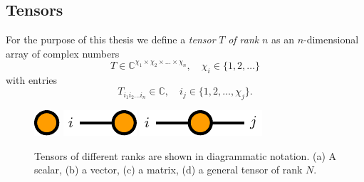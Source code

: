 \subsection*{Tensors}
For the purpose of this thesis we define a \textit{tensor} $T$ \textit{of rank} $n$ as an $n$-dimensional array of complex numbers
\begin{equation}
	T \in \mathbb{C}^{\chi_1\times\chi_2\times\dots\times\chi_n}, \quad \chi_i \in \{1, 2, \dots\}
\end{equation}
with entries
\begin{equation}
	T_{i_1i_2\dots i_n} \in \mathbb{C}, \quad i_j \in \{1, 2, \dots, \chi_j\}.
\end{equation}
\begin{figure}
	\centering
	\subcaptionbox{\label{fig:basic_tensor_diagrams_scalar}}
	{%
		\raisebox{\dimexpr.5\ht\largestimage-.5\height}
		{%
			\includegraphics[scale=1]{figures/tikz/Tensor_Networks/basic_diagrams/basic_diagrams_a.pdf}
		}
	}
	\subcaptionbox{\label{fig:basic_tensor_diagrams_vector}}
	{%
		\raisebox{\dimexpr.5\ht\largestimage-.5\height}
		{%
			\includegraphics[scale=1]{figures/tikz/Tensor_Networks/basic_diagrams/basic_diagrams_b.pdf}
		}
	}
	\subcaptionbox{\label{fig:basic_tensor_diagrams_matrix}}
	{%
		\raisebox{\dimexpr.5\ht\largestimage-.5\height}
		{%
			\includegraphics[scale=1]{figures/tikz/Tensor_Networks/basic_diagrams/basic_diagrams_c.pdf}
		}
	}
	\subcaptionbox{\label{fig:basic_tensor_diagrams_rank_n_tensor}}
	{%
		\usebox{\largestimage}
	}
\caption{Tensors of different ranks are shown in diagrammatic notation. (a) A scalar, (b) a vector, (c) a matrix, (d) a general tensor of rank $N$.}
\label{fig:basic_tensor_diagrams}
\end{figure}
